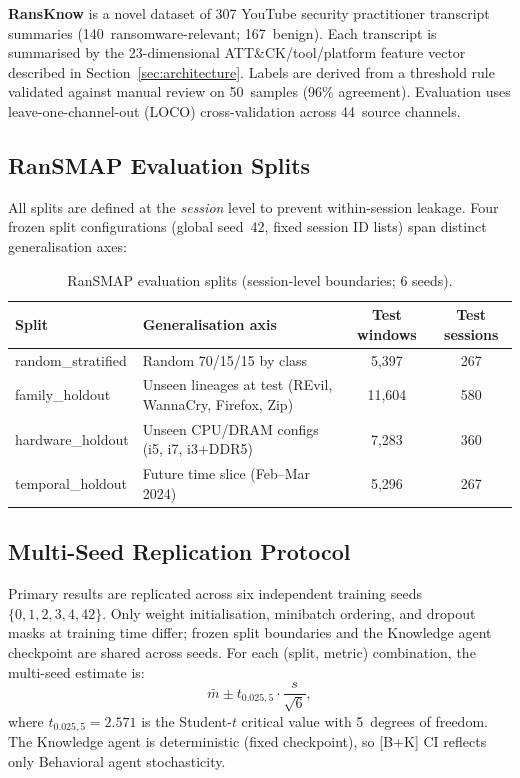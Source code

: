 \documentclass[journal]{IEEEtran}
\begin{document}
\textbf{RansKnow} is a novel dataset of 307 YouTube security practitioner transcript
summaries (140~ransomware-relevant; 167~benign).
Each transcript is summarised by the 23-dimensional ATT\&CK/tool/platform feature vector
described in Section~\ref{sec:architecture}.
Labels are derived from a threshold rule validated against manual review on 50~samples
(96\% agreement).
Evaluation uses leave-one-channel-out (LOCO) cross-validation across 44~source channels.

\subsection{RanSMAP Evaluation Splits}
\label{subsec:splits}

All splits are defined at the \emph{session} level to prevent within-session leakage.
Four frozen split configurations (global seed~42, fixed session ID lists) span
distinct generalisation axes:

\begin{table}[t]
\centering
\caption{RanSMAP evaluation splits (session-level boundaries; 6 seeds).}
\label{tab:splits}
\setlength{\tabcolsep}{3pt}
\begin{tabular}{lp{2.6cm}cc}
\toprule
\textbf{Split} & \textbf{Generalisation axis} &
\textbf{Test windows} & \textbf{Test sessions} \\
\midrule
random\_stratified & Random 70/15/15 by class & 5,397 & 267 \\
family\_holdout & Unseen lineages at test (REvil, WannaCry, Firefox, Zip) & 11,604 & 580 \\
hardware\_holdout & Unseen CPU/DRAM configs (i5, i7, i3+DDR5) & 7,283 & 360 \\
temporal\_holdout & Future time slice (Feb--Mar 2024) & 5,296 & 267 \\
\bottomrule
\end{tabular}
\end{table}

\subsection{Multi-Seed Replication Protocol}

Primary results are replicated across six independent training seeds $\{0,1,2,3,4,42\}$.
Only weight initialisation, minibatch ordering, and dropout masks at training time differ;
frozen split boundaries and the Knowledge agent checkpoint are shared across seeds.
For each (split, metric) combination, the multi-seed estimate is:
\begin{equation}
\bar{m} \pm t_{0.025,5} \cdot \frac{s}{\sqrt{6}},
\label{eq:ci}
\end{equation}
where $t_{0.025,5} = 2.571$ is the Student-$t$ critical value with 5~degrees of freedom.
The Knowledge agent is deterministic (fixed checkpoint), so {[}B{+}K{]} CI reflects
only Behavioral agent stochasticity.
\end{document}
